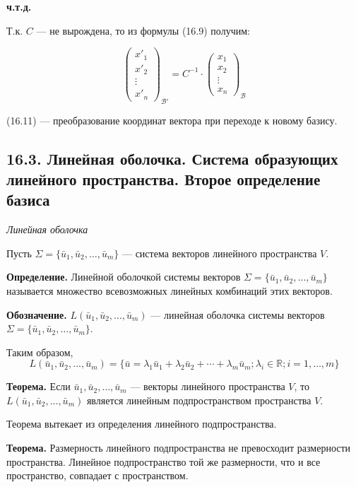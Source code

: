 \documentclass[12pt,a4paper]{article}
\newcommand{\vu}{\bar u}
\begin{document}
\textbf{ч.т.д.}

Т.к. $C$ --- не вырождена, то из формулы (16.9) получим:

\begin{equation}
\begin{pmatrix} x'_1 \\ x'_2 \\ \vdots \\ x'_n
\end{pmatrix}_{\mathcal{B}'} = C^{-1} \cdot
\begin{pmatrix} x_1 \\ x_2 \\ \vdots \\ x_n
\end{pmatrix}_{\mathcal{B}} \tag{16.11}
\end{equation}

(16.11) --- преобразование координат вектора при переходе к новому базису.

\subsection*{\textbf{16.3. Линейная оболочка. Система образующих
линейного пространства. Второе определение базиса}}

\textit{Линейная оболочка}

Пусть $\Sigma = \{\vu_1, \vu_2, \ldots, \vu_m\}$ --- система векторов
линейного пространства $V$.

\textbf{Определение.} Линейной оболочкой системы векторов $\Sigma =
\{\vu_1, \vu_2, \ldots, \vu_m\}$ называется множество всевозможных
линейных комбинаций этих векторов.

\textbf{Обозначение.} $L(\vu_1, \vu_2, \ldots, \vu_m)$ --- линейная
оболочка системы векторов $\Sigma = \{\vu_1, \vu_2, \ldots, \vu_m\}$.

Таким образом,
$$
L(\vu_1, \vu_2, \ldots, \vu_m) = \{\vu = \lambda_1 \vu_1 + \lambda_2
\vu_2 + \cdots + \lambda_m \vu_m; \lambda_i \in \mathbb{R}; i = 1, \ldots, m\}
$$

\textbf{Теорема.} Если $\vu_1, \vu_2, \ldots, \vu_m$ --- векторы
линейного пространства $V$, то $L(\vu_1, \vu_2, \ldots, \vu_m)$
является линейным подпространством пространства $V$.

Теорема вытекает из определения линейного подпространства.

\textbf{Теорема.} Размерность линейного подпространства не
превосходит размерности пространства. Линейное подпространство той же
размерности, что и все пространство, совпадает с пространством.
\end{document}
